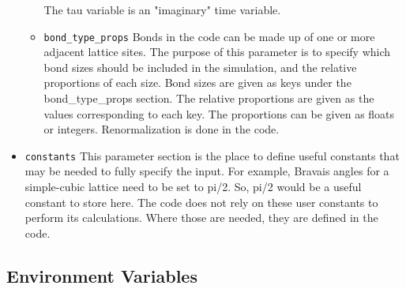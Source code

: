 \begin{itemize}
\begin{itemize}
        The tau variable is an "imaginary" time variable.
      \item \texttt{bond\_type\_props}
        Bonds in the code can be made up of one or more adjacent lattice sites.
        The purpose of this parameter is to specify which bond sizes should be
        included in the simulation, and the relative proportions of each size.
        Bond sizes are given as keys under the bond\_type\_props section.
        The relative proportions are given as the values corresponding to each 
        key.
        The proportions can be given as floats or integers. 
        Renormalization is done in the code.
    \end{itemize}
  \item \texttt{constants}
    This parameter section is the place to define useful constants that may be
    needed to fully specify the input. 
    For example, Bravais angles for a simple-cubic lattice need to be set to 
    pi/2.
    So, pi/2 would be a useful constant to store here.
    The code does not rely on these user constants to perform its calculations.
    Where those are needed, they are defined in the code. 
\end{itemize}


\subsection{Environment Variables}